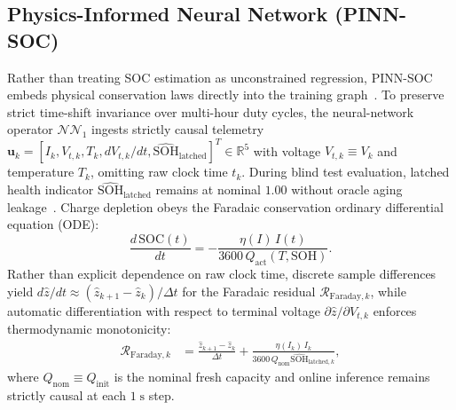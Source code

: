 \documentclass[10pt,a4paper]{article}
\begin{document}
\subsection{Physics-Informed Neural Network (PINN-SOC)}
Rather than treating SOC estimation as unconstrained regression, PINN-SOC embeds physical conservation laws directly into the training graph~\cite{Raissi2019pinn,Brancato2026}. To preserve strict time-shift invariance over multi-hour duty cycles, the neural-network operator $\mathcal{NN}_1$ ingests strictly causal telemetry $\mathbf{u}_k = [I_k, V_{t,k}, T_k, dV_{t,k}/dt, \hat{\text{SOH}}_{\text{latched}}]^T \in \mathbb{R}^5$ with voltage $V_{t,k} \equiv V_k$ and temperature $T_k$, omitting raw clock time $t_k$. During blind test evaluation, latched health indicator $\hat{\text{SOH}}_{\text{latched}}$ remains at nominal $1.00$ without oracle aging leakage~\cite{Le2026charging}. Charge depletion obeys the Faradaic conservation ordinary differential equation (ODE):
\begin{equation}\label{eqn:pinn_ode}
\frac{d\,\text{SOC}(t)}{dt} = -\frac{\eta(I)\, I(t)}{3600\,Q_{\text{act}}(T, \text{SOH})}.
\end{equation}
Rather than explicit dependence on raw clock time, discrete sample differences yield $d\hat{z}/dt \approx (\hat{z}_{k+1} - \hat{z}_k)/\Delta t$ for the Faradaic residual $\mathcal{R}_{\text{Faraday},k}$, while automatic differentiation with respect to terminal voltage $\partial \hat{z}/\partial V_{t,k}$ enforces thermodynamic monotonicity:
\begin{align}
\mathcal{R}_{\text{Faraday},k} &= \frac{\hat{z}_{k+1} - \hat{z}_k}{\Delta t} + \frac{\eta(I_k)\, I_k}{3600\,Q_{\text{nom}} \hat{\text{SOH}}_{\text{latched},k}}, \label{eqn:res_faraday}
\end{align}
where $Q_{\text{nom}} \equiv Q_{\text{init}}$ is the nominal fresh capacity and online inference remains strictly causal at each $1\;\mathrm{s}$ step.
\end{document}
